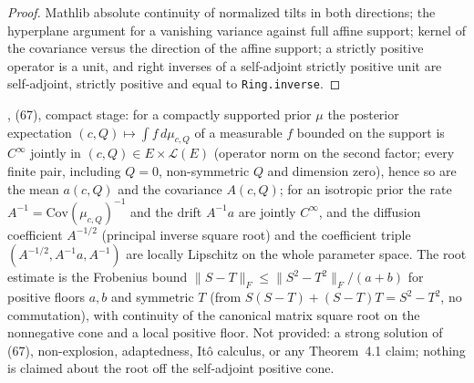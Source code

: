 \begin{proof}
  \leanok
  Mathlib absolute continuity of normalized tilts in both directions; the hyperplane argument for a
  vanishing variance against full affine support; kernel of the covariance versus the direction of the
  affine support; a strictly positive operator is a unit, and right inverses of a self-adjoint
  strictly positive unit are self-adjoint, strictly positive and equal to \texttt{Ring.inverse}.
\end{proof}

\begin{lemma}
  \label{lem:bkl-coefficients-regularity}
  \leanok
  \cite{BizeulKlartagLehec2026}, (67), compact stage: for a compactly supported prior $\mu$ the posterior
  expectation $(c,Q)\mapsto\int f\,d\mu_{c,Q}$ of a measurable $f$ bounded on the support is $C^\infty$
  jointly in $(c,Q)\in E\times\mathcal L(E)$ (operator norm on the second factor; every finite pair,
  including $Q=0$, non-symmetric $Q$ and dimension zero), hence so are the mean $a(c,Q)$ and the covariance
  $A(c,Q)$; for an isotropic prior the rate $A^{-1}=\mathrm{Cov}(\mu_{c,Q})^{-1}$ and the drift $A^{-1}a$
  are jointly $C^\infty$, and the diffusion coefficient $A^{-1/2}$ (principal inverse square root) and the
  coefficient triple $(A^{-1/2},A^{-1}a,A^{-1})$ are locally Lipschitz on the whole parameter space.  The
  root estimate is the Frobenius bound $\|S-T\|_F\le\|S^2-T^2\|_F/(a+b)$ for positive floors $a,b$ and
  symmetric $T$ (from $S(S-T)+(S-T)T=S^2-T^2$, no commutation), with continuity of the canonical matrix
  square root on the nonnegative cone and a local positive floor.  Not provided: a strong solution of (67),
  non-explosion, adaptedness, It\^o calculus, or any Theorem~4.1 claim; nothing is claimed about the root
  off the self-adjoint positive cone.
\end{lemma}
